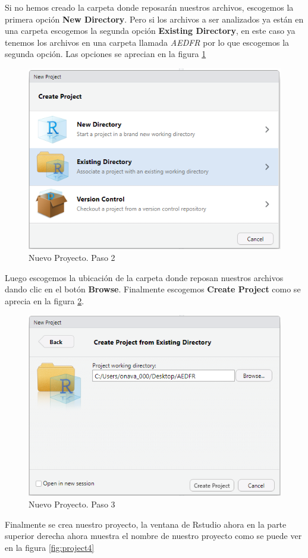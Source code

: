 \documentclass[]{book}
\begin{document}
Si no hemos creado la carpeta donde reposarán nuestros archivos, escogemos la primera opción \textbf{New Directory}. Pero si los archivos a ser analizados ya están en una carpeta escogemos la segunda opción \textbf{Existing Directory}, en este caso ya tenemos los archivos en una carpeta llamada \emph{AEDFR} por lo que escogemos la segunda opción. Las opciones se aprecian en la figura \ref{fig:project2}

\begin{figure}[h!]

{\centering \includegraphics[width=0.5\linewidth]{project2} 

}

\caption{Nuevo Proyecto. Paso 2}\label{fig:project2}
\end{figure}

Luego escogemos la ubicación de la carpeta donde reposan nuestros archivos dando clic en el botón \textbf{Browse}. Finalmente escogemos \textbf{Create Project} como se aprecia en la figura \ref{fig:project3}.

\begin{figure}[h!]

{\centering \includegraphics[width=0.5\linewidth]{project3} 

}

\caption{Nuevo Proyecto. Paso 3}\label{fig:project3}
\end{figure}

Finalmente se crea nuestro proyecto, la ventana de Rstudio ahora en la parte superior derecha ahora muestra el nombre de nuestro proyecto como se puede ver en la figura \ref{fig:project4}
\end{document}
